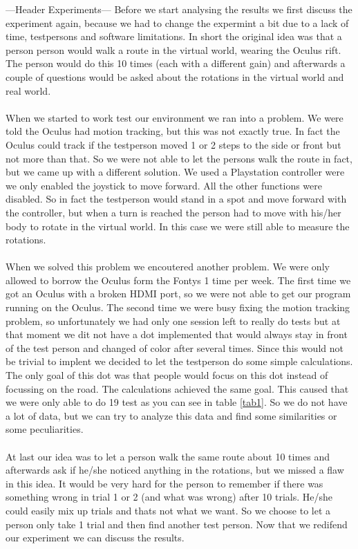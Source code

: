 ---Header Experiments---
Before we start analysing the results we first discuss the experiment again, because we had to change the expermint a bit due to a lack of time, testpersons and software limitations. In short the original idea was that a person person would walk a route in the virtual world, wearing the Oculus rift. The person would do this 10 times (each with a different gain) and afterwards a couple of questions would be asked about the rotations in the virtual world and real world. \\
\\
When we started to work test our environment we ran into a problem. We were told the Oculus had motion tracking, but this was not exactly true. In fact the Oculus could track if the testperson moved 1 or 2 steps to the side or front but not more than that. So we were not able to let the persons walk the route in fact, but we came up with a different solution. We used a Playstation controller were we only enabled the joystick to move forward. All the other functions were disabled. So in fact the testperson would stand in a spot and move forward with the controller, but when a turn is reached the person had to move with his/her body to rotate in the virtual world. In this case we were still able to measure the rotations.\\
\\
When we solved this problem we encoutered another problem. We were only allowed to borrow the Oculus form the Fontys 1 time per week. The first time we got an Oculus with a broken HDMI port, so we were not able to get our program running on the Oculus. The second time we were busy fixing the motion tracking problem, so unfortunately we had only one session left to really do tests but at that moment we dit not have a dot implemented that would always stay in front of the test person and changed of color after several times. Since this would not be trivial to implent we decided to let the testperson do some simple calculations. The only goal of this dot was that people would focus on this dot instead of focussing on the road. The calculations achieved the same goal. This caused that we were only able to do 19 test as you can see in table \ref{tab1}. So we do not have a lot of data, but we can try to analyze this data and find some similarities or some peculiarities. \\
\\
At last our idea was to let a person walk the same route about 10 times and afterwards ask if he/she noticed anything in the rotations, but we missed a flaw in this idea. It would be very hard for the person to remember if there was something wrong in trial 1 or 2 (and what was wrong) after 10 trials. He/she could easily mix up trials and thats not what we want. So we choose to let a person only take 1 trial and then find another test person. Now that we redifend our experiment we can discuss the results. \\

